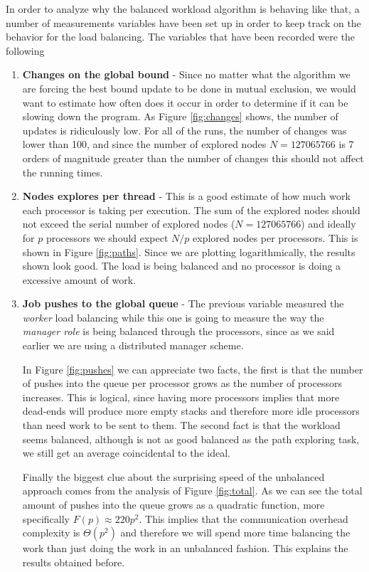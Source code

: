 \documentclass[a4paper]{article}
\begin{document}
\newpage

    In order to analyze why the balanced workload algorithm is behaving like that, a number of measurements variables have been set up in order to keep track on the behavior for the load balancing. The variables that have been recorded were the following
    \begin{enumerate}
        \item \textbf{Changes on the global bound} - Since no matter what the algorithm we are forcing the best bound update to be done in mutual exclusion, we would want to estimate how often does it occur in order to determine if it can be slowing down the program.  As Figure \ref{fig:changes} shows, the number of updates is ridiculously low. For all of the runs, the number of changes was lower than 100, and since the number of explored nodes $N = 127065766$ is 7 orders of magnitude greater than the number of changes this should not affect the running times.

        \item \textbf{Nodes explores per thread} - This is a good estimate of how much work each processor is taking per execution. The sum of the explored nodes should not exceed the serial number of explored nodes ($N = 127065766$) and ideally for $p$ processors we should expect $N/p$ explored nodes per processors. This is shown in Figure \ref{fig:paths}. Since we are plotting logarithmically, the results shown look good. The load is being balanced and no processor is doing a excessive amount of work.

        \item \textbf{Job pushes to the global queue} - The previous variable measured the \emph{worker} load balancing while this one is going to measure the way the \emph{manager role} is being balanced through the processors, since as we said earlier we are using a distributed manager scheme.

        In Figure \ref{fig:pushes} we can appreciate two facts, the first is that the number of pushes into the queue per processor grows as the number of processors increases. This is logical, since having more processors implies that more dead-ends will produce more empty stacks and therefore more idle processors than need work to be sent to them. The second fact is that the workload seems balanced, although is not as good balanced as the path exploring task, we still get an average coincidental to the ideal.

        Finally the biggest clue about the surprising speed of the unbalanced approach comes from the analysis of Figure \ref{fig:total}. As we can see the total amount of pushes into the queue grows as a quadratic function, more specifically $F(p) \approx 220p^2$. This implies that the communication overhead complexity is $\Theta(p^2)$ and therefore we will spend more time balancing the work than just doing the work in an unbalanced fashion. This explains the results obtained before.

    \end{enumerate}
\end{document}
